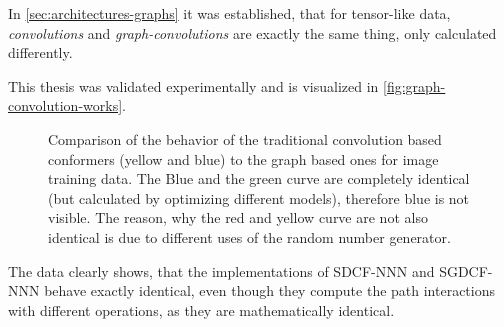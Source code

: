 In \autoref{sec:architectures-graphs} it was established, that for tensor-like data, \emph{convolutions} and \emph{graph-convolutions} are exactly the same thing, only calculated differently.

This thesis was validated experimentally and is visualized in \autoref{fig:graph-convolution-works}.

\begin{figure}[htbp]
    \centering
    \caption{
        Comparison of the behavior of the traditional convolution based conformers (yellow and blue) to the graph based ones for image training data.
        The Blue and the green curve are completely identical (but calculated by optimizing different models), therefore blue is not visible.
        The reason, why the red and yellow curve are not also identical is due to different uses of the random number generator.
    }
    \label{fig:graph-convolution-works}
\end{figure}

The data clearly shows, that the implementations of SDCF-NNN and SGDCF-NNN behave exactly identical, even though they compute the path interactions with different operations, as they are mathematically identical.

